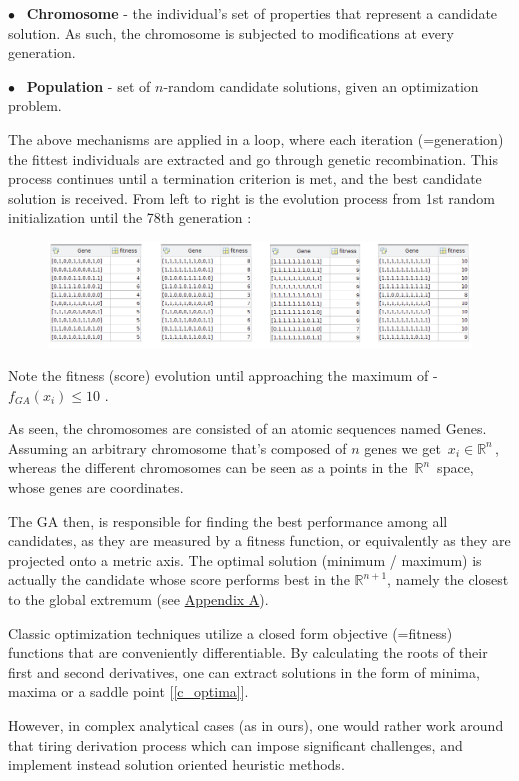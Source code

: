 \documentclass[12pt]{article}
\numberwithin{equation}{section}
\begin{document}
\begin{flushleft}
$\bullet$ \ \textbf{Chromosome} - the individual's set of properties that represent a candidate solution. As such, the chromosome is subjected to modifications at every generation.

$\bullet$ \ \textbf{Population} - set of $n$-random candidate solutions, given an optimization problem.

The above mechanisms are applied in a loop, where each iteration (=generation) the fittest individuals are extracted and go through genetic recombination. This process continues until a termination criterion is met, and the best candidate solution is received. From left to right is the evolution process from 1st random initialization until the 78th generation :
\begin{figure}[H]
\centering
\includegraphics[width=1.13\linewidth, center]{performance.png}
\end{figure}
Note the fitness (score) evolution until approaching the maximum of - $f_{GA}(x_i) \leq 10$ . 

As seen, the chromosomes are consisted of an atomic sequences named Genes. Assuming an arbitrary chromosome that's composed of $n$ genes we get \,$x_i \in \mathbb{R}^n$\,, \,whereas the different chromosomes can be seen as a points in the \,$\mathbb{R}^{n}$\, space, whose genes are coordinates. 

The GA then, is responsible for finding the best performance among all candidates, as they are measured by a fitness function, or equivalently as they are projected onto a metric axis. The optimal solution (minimum / maximum) is actually the candidate whose score performs best in the $\mathbb{R}^{n+1}$, namely the closest to the global extremum (see \hyperlink{app_extremum}{Appendix A}).

Classic optimization techniques utilize a closed form objective (=fitness) functions that are conveniently differentiable. By calculating the roots of their first and second derivatives, one can extract solutions in the form of minima, maxima or a saddle point [\ref{c_optima}]. 

However, in complex analytical cases (as in ours), one would rather work around that tiring derivation process which can impose significant challenges, and implement instead solution oriented heuristic methods.


\end{flushleft}
\end{document}
